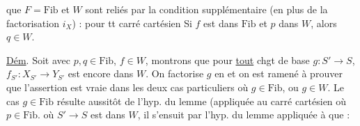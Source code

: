 que $F=\mathrm{Fib}$ et $W$ sont reliés par la condition supplémentaire (en plus de la factorisation $i_X$) : pour tt carré cartésien
Si $f$ est dans $\mathrm{Fib}$ et $p$ dans $W$, alors $q\in W$.

\uline{Dém}. Soit
avec $p,q\in\mathrm{Fib}$, $f\in W$, montrons que pour \uline{tout} chgt de base $g:S'\longrightarrow S$, $f_{S'}:X_{S'}\longrightarrow Y_{S'}$ est encore dans $W$. On factorise $g$ en
et on est ramené à prouver que l'assertion est vraie dans les deux cas particuliers où $g\in\mathrm{Fib}$, ou $g\in W$. Le cas $g\in\mathrm{Fib}$ résulte aussitôt de l'hyp. du lemme (appliquée au  carré cartésien
  où $p\in\mathrm{Fib}$.
 où $S'\longrightarrow S$ est dans $W$, il s'ensuit par l'hyp. du lemme appliquée à
que :
